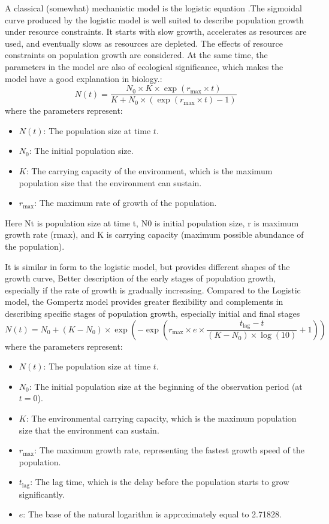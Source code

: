 \documentclass{article}
\begin{document}
A classical (somewhat) mechanistic model is the logistic equation\cite{zwietering1990} .The sigmoidal curve produced by the logistic model is well suited to describe population growth under resource constraints. It starts with slow growth, accelerates as resources are used, and eventually slows as resources are depleted. The effects of resource constraints on population growth are considered. At the same time, the parameters in the model are also of ecological significance, which makes the model have a good explanation in biology.:
\begin{equation}
    N(t) = \frac{N_0 \times K \times \exp(r_{\text{max}} \times t)}{K + N_0 \times (\exp(r_{\text{max}} \times t) - 1)}
\end{equation}
where the parameters represent:
\begin{itemize}
    \item $N(t)$: The population size at time $t$.
    \item $N_0$: The initial population size.
    \item $K$: The carrying capacity of the environment, which is the maximum population size that the environment can sustain.
    \item $r_{\text{max}}$: The maximum rate of growth of the population.
\end{itemize}
Here Nt is population size at time t, N0 is initial population size, r is maximum growth rate (rmax), and K is carrying capacity (maximum possible abundance of the population).


It is similar in form to the logistic model, but provides different shapes of the growth curve, Better description of the early stages of population growth, especially if the rate of growth is gradually increasing\cite{zwietering1990}. Compared to the Logistic model, the Gompertz model provides greater flexibility and complements in describing specific stages of population growth, especially initial and final stages
\begin{equation}
    N(t) = N_0 + (K - N_0) \times \exp\left(-\exp\left(r_{\text{max}} \times e \times \frac{t_{\text{lag}} - t}{(K - N_0) \times \log(10)} + 1\right)\right)
\end{equation}
where the parameters represent:
\begin{itemize}
    \item $N(t)$: The population size at time $t$.
    \item $N_0$: The initial population size at the beginning of the observation period (at $t = 0$).
    \item $K$: The environmental carrying capacity, which is the maximum population size that the environment can sustain.
    \item $r_{\text{max}}$: The maximum growth rate, representing the fastest growth speed of the population.
    \item $t_{\text{lag}}$: The lag time, which is the delay before the population starts to grow significantly.
    \item $e$: The base of the natural logarithm is approximately equal to 2.71828.
\end{itemize}
\end{document}
